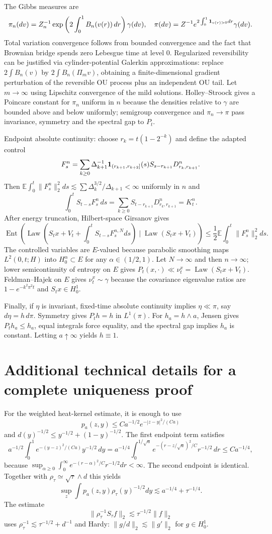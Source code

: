 \documentclass[12pt]{article}
\newcommand{\E}{\mathbb E}
\newcommand{\Law}{\operatorname{Law}}
\newcommand{\Ent}{\operatorname{Ent}}
\begin{document}
The Gibbs measures are
\[
\pi_n(dv)=Z_n^{-1}\exp\left(2\int_0^1B_n(v(r))\,dr\right)\gamma(dv),\quad
\pi(dv)=Z^{-1}e^{2\int_0^1{\bf1}_{v(r)>0}dr}\gamma(dv).
\]
Total variation convergence follows from bounded convergence and the fact
that Brownian bridge spends zero Lebesgue time at level $0$.  Regularized
reversibility can be justified via cylinder-potential Galerkin
approximations: replace $2\int B_n(v)$ by $2\int B_n(\Pi_m v)$, obtaining a
finite-dimensional gradient perturbation of the reversible OU process plus an
independent OU tail.  Let $m\to\infty$ using Lipschitz convergence of the mild
solutions.  Holley--Stroock gives a Poincare constant for $\pi_n$ uniform in
$n$ because the densities relative to $\gamma$ are bounded above and below
uniformly; semigroup convergence and $\pi_n\to\pi$ pass invariance, symmetry
and the spectral gap to $P_t$.

Endpoint absolute continuity: choose $r_k=t(1-2^{-k})$ and define the adapted
control
\[
F_s^n=\sum_{k\ge0}\Delta_{k+1}^{-1}{\bf1}_{(r_{k+1},r_{k+2}]}(s)
      S_{s-r_{k+1}}D^n_{r_k,r_{k+1}} .
\]
Then $\E\int_0^t\|F_s^n\|_2^2ds\lesssim
\sum\Delta_k^{3/2}/\Delta_{k+1}<\infty$ uniformly in $n$ and
\[
\int_0^tS_{t-s}F_s^n\,ds=\sum_{k\ge0}S_{t-r_{k+1}}D^n_{r_k,r_{k+1}}=K_t^n .
\]
After energy truncation, Hilbert-space Girsanov gives
\[
\Ent(\Law(S_tx+V_t+\int_0^tS_{t-s}F_s^{n,N}ds)\mid\Law(S_tx+V_t))
 \le \frac12\E\int_0^t\|F_s^n\|_2^2ds.
\]
The controlled variables are $E$-valued because parabolic smoothing maps
$L^2(0,t;H)$ into $H^\alpha_0\subset E$ for any $\alpha\in(1/2,1)$.  Let
$N\to\infty$ and then $n\to\infty$; lower semicontinuity of entropy on $E$
gives $P_t(x,\cdot)\ll\nu_t^x=\Law(S_tx+V_t)$.  Feldman--Hajek on $E$ gives
$\nu_t^x\sim\gamma$ because the covariance eigenvalue ratios are
$1-e^{-k^2\pi^2t}$ and $S_tx\in H^1_0$.

Finally, if $\eta$ is invariant, fixed-time absolute continuity implies
$\eta\ll\pi$, say $d\eta=h\,d\pi$.  Symmetry gives $P_th=h$ in $L^1(\pi)$.
For $h_a=h\wedge a$, Jensen gives $P_th_a\le h_a$, equal integrals force
equality, and the spectral gap implies $h_a$ is constant.  Letting
$a\uparrow\infty$ yields $h\equiv1$.


\section*{Additional technical details for a complete uniqueness proof}

For the weighted heat-kernel estimate, it is enough to use
\[
p_a(z,y)\le Ca^{-1/2}e^{-|z-y|^2/(Ca)}
\]
and $d(y)^{-1/2}\le y^{-1/2}+(1-y)^{-1/2}$.  The first endpoint term satisfies
\[
a^{-1/2}\int_0^1e^{-(y-z)^2/(Ca)}y^{-1/2}\,dy
 =a^{-1/4}\int_0^{1/\sqrt a}e^{-(r-z/\sqrt a)^2/C}r^{-1/2}\,dr
 \le Ca^{-1/4},
\]
because
$\sup_{\alpha\ge0}\int_0^\infty e^{-(r-\alpha)^2/C}r^{-1/2}dr<\infty$.
The second endpoint is identical.  Together with
$\rho_\tau\simeq \sqrt{\tau}\wedge d$ this yields
\[
\sup_z\int p_a(z,y)\rho_\tau(y)^{-1/2}dy
 \lesssim a^{-1/4}+\tau^{-1/4}.
\]
The estimate
\[
\|\rho_\tau^{-1}S_\tau f\|_2\lesssim \tau^{-1/2}\|f\|_2
\]
uses $\rho_\tau^{-1}\lesssim \tau^{-1/2}+d^{-1}$ and Hardy:
$\|g/d\|_2\lesssim \|g'\|_2$ for $g\in H^1_0$.
\end{document}
